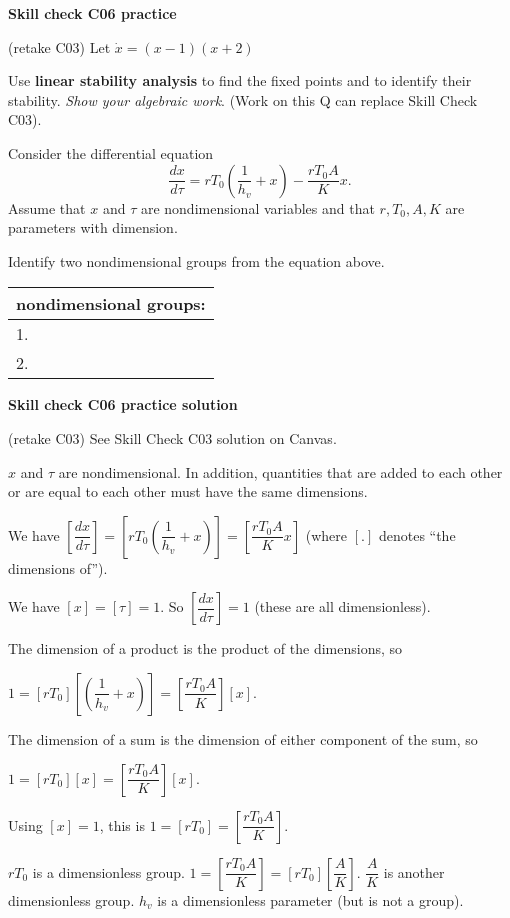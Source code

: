 \documentclass[12pt,letterpaper,noanswers]{exam}
\begin{document}
\noindent\textbf{Skill check C06 practice} 
\begin{questions}
\item (retake C03) Let $\dot x = (x-1)(x+2)$

Use \textbf{linear stability analysis} to find the fixed points and to identify their stability. \emph{Show your algebraic work}.  (Work on this Q can replace Skill Check C03).
\item Consider the differential equation \[\frac{dx}{d\tau} = r T_0\left(\frac{1}{h_v}+ x\right)- \frac{r T_0 A}{K} x.\]
Assume that $x$ and $\tau$ are nondimensional variables and that $r, T_0, A, K$ are parameters with dimension.

Identify two nondimensional groups from the equation above.

\bgroup
\def\arraystretch{4}
\begin{tabular}{|p{7cm}|}
\hline
nondimensional groups: \\
\hline\hline
1.\hfill\\
 \hline
2.\hfill \\
 \hline
\end{tabular}
\egroup
\end{questions}

\noindent\textbf{Skill check C06 practice solution} 
\begin{questions}
\item (retake C03) See Skill Check C03 solution on Canvas.
\item $x$ and $\tau$ are nondimensional.  In addition, quantities that are added to each other or are equal to each other must have the same dimensions.

We have $\left[\dfrac{dx}{d\tau}\right] = \left[r T_0\left(\dfrac{1}{h_v}+ x\right)\right] = \left[\dfrac{r T_0 A}{K} x\right]$ (where $\left[ . \right]$ denotes ``the dimensions of'').

We have $\left[x \right] = \left[\tau\right] = 1$.  So $\left[\dfrac{dx}{d\tau}\right] = 1$ (these are all dimensionless).

The dimension of a product is the product of the dimensions, so

$1 = \left[r T_0\right]\left[\left(\dfrac{1}{h_v}+ x\right)\right] = \left[\dfrac{r T_0 A}{K}\right]\left[ x\right]$.

The dimension of a sum is the dimension of either component of the sum, so

$1 = \left[r T_0\right]\left[x\right] = \left[\dfrac{r T_0 A}{K}\right]\left[ x\right]$.

Using $\left[x \right] = 1$, this is $1 = \left[r T_0\right] = \left[\dfrac{r T_0 A}{K}\right]$.

$rT_0$ is a dimensionless group.  $1 = \left[\dfrac{r T_0 A}{K}\right] = \left[rT_0\right]\left[\dfrac{A}{K}\right]$.  $\dfrac{A}{K}$ is another dimensionless group.  $h_v$ is a dimensionless parameter (but is not a group).


\end{questions}
\end{document}
